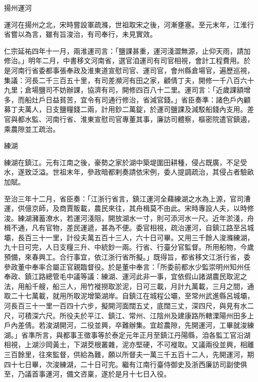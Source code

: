 \begin{pinyinscope}
 揚州運河



 運河在揚州之北，宋時嘗設軍疏滌，世祖取宋之後，河漸壅塞。至元末年，江淮行省嘗以為言，雖有旨浚治，有司奉行，未見實效。



 仁宗延祐四年十一月，兩淮運司言：「鹽課甚重，運河淺澀無源，止仰天雨，請加修治。」明年二月，中書移文河南省，選官洎運司有司官相視，會計工程費用。於是河南行省委都事張奉政及淮東道宣慰司官、運司官，會州縣倉場官，遍歷巡視，集議：河長二千三百五十里，有司差瀕河有田之家，顧倩丁夫，開修一千八百六十九里；倉場鹽司不妨辦課，協濟有司，開修四百八十二里。運司言：「近歲課額增多，而船灶戶日益貧苦，宜令有司通行修治，省減官錢。」省臣奏準：諸色戶內顧募丁夫萬人，日支鹽糧錢二兩，計用鈔二萬錠，於運司鹽課及減駁船錢內支用。差官與都水監、河南行省、淮東宣慰司官專董其事，廉訪司體察，樞密院遣官鎮遏，乘農隙並工疏治。



 練湖



 練湖在鎮江。元有江南之後，豪勢之家於湖中築堤圍田耕種，侵占既廣，不足受水，遂致泛溢。世祖末年，參政暗都剌奏請依宋例，委人提調疏治，其侵占者驗畝加賦。



 至治三年十二月，省臣奏：「江浙行省言，鎮江運河全藉練湖之水為上源，官司漕運，供億京師，及商賈販載，農民來往，其舟楫莫不由此。宋時專設人夫，以時修浚。練湖瀦蓄潦水，若運河淺阻，開放湖水一寸，則可添河水一尺。近年淤淺，舟楫不通，凡有官物，差民運遞，甚為不便。委官相視，疏治運河，自鎮江路至呂城壩，長百三十一里，計役夫萬五百十三人，六十日可畢。又用三千餘人浚滌練湖，九十日可完，人日支糧三升、中統鈔一兩。行省、行臺分官監督。所用船物，今歲預備，來春興工。合行事宜，依江浙行省所擬。」既得旨，都省移文江浙行省，委參政董中奉率合屬正官親臨督役。於是董中奉言：「所委前都水少監崇明州知州任奉政、鎮江路總管毛中議等議：練湖、運河此非一事，宜依假山諸湖農民取泥之法，用船千艘，船三人，用竹褷撈取淤泥，日可三載，月計九萬載，三月之間，通取二十七萬載，就用所取泥增築湖岸。自鎮江在城程公壩，至常州武進縣呂城壩，河長百三十一里一百四十六步，擬開河面闊五丈，底闊三丈，深四尺，與見有水二尺，可積深六尺。所役夫於平江、鎮江、常州、江陰州及建康路所轄溧陽州田多上戶內差倩。若浚湖開河，二役並興，卒難辦集。宜趁農隙，先開運河，工畢就浚練湖。」省準所言，與都事王徵事等於泰定元年正月至鎮江丹陽縣，洎各監工官沿湖相視，上湖沙岡黃土，下湖茭根叢雜，泥亦堅硬，不可褷取。又議兩役並興，相離三百餘里，往來監督，供給為難，願以所督夫一萬三千五百十二人，先開運河，期四十七日畢，次浚練湖，二十日可完。繼有江南行臺侍御史及浙西廉訪司副使俱至，乃議首事運河，備文咨稟，遂於是月十七日入役。




\end{pinyinscope}
